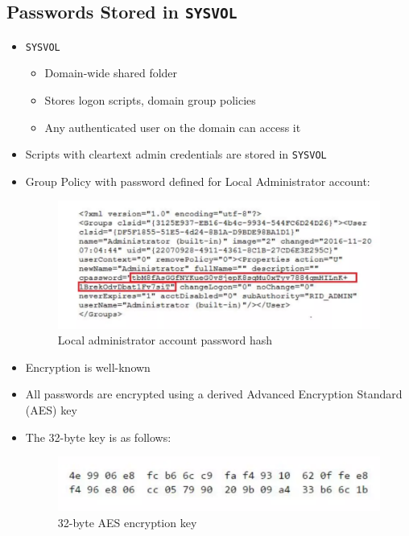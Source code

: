 \subsection{Passwords Stored in \texttt{SYSVOL}}
\begin{itemize}
    \item \texttt{SYSVOL}
    \begin{itemize}
        \item Domain-wide shared folder
        \item Stores logon scripts, domain group policies
        \item Any authenticated user on the domain can access it
    \end{itemize}
\item Scripts with cleartext admin credentials are stored in \texttt{SYSVOL}
\item Group Policy with password defined for Local Administrator account:
\begin{figure}
    \centering
    \includegraphics[width=0.75\linewidth]{adminpwd.png}
    \caption{Local administrator account password hash}
    \label{fig:placeholder}
\end{figure}
\end{itemize}
\begin{itemize}
    \item Encryption is well-known
    \item All passwords are encrypted using a derived Advanced Encryption Standard (AES) key
    \item The 32-byte key is as follows:
\begin{figure}
    \centering
    \includegraphics[width=0.75\linewidth]{aes.png}
    \caption{32-byte AES encryption key}
    \label{fig:placeholder}
\end{figure}
\end{itemize}
